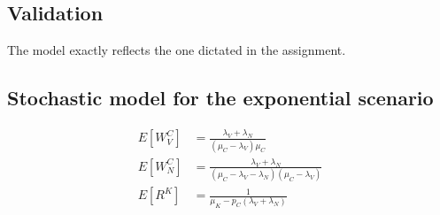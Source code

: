 \subsection{Validation}
The model exactly reflects the one dictated in the assignment.

\subsection{Stochastic model for the exponential scenario}
\begin{align}
    E[W^C_{V}] &= \frac{\lambda_V + \lambda_N}{(\mu_C-\lambda_{V})\mu_C} \\
    E[W^C_{N}] &= \frac{\lambda_V + \lambda_N}{(\mu_C-\lambda_{V}-\lambda_N)(\mu_C-\lambda_{V})} \\
    E[R^K] &= \frac{1}{\mu_K-p_C(\lambda_{V}+\lambda_{N})}
\end{align}